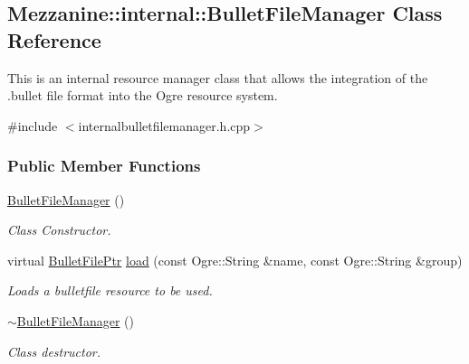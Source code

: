 \hypertarget{classMezzanine_1_1internal_1_1BulletFileManager}{
\subsection{Mezzanine::internal::BulletFileManager Class Reference}
\label{classMezzanine_1_1internal_1_1BulletFileManager}
}


This is an internal resource manager class that allows the integration of the .bullet file format into the Ogre resource system.  




{\ttfamily \#include $<$internalbulletfilemanager.h.cpp$>$}

\subsubsection*{Public Member Functions}
\begin{DoxyCompactItemize}
\item 
\hypertarget{classMezzanine_1_1internal_1_1BulletFileManager_a6025009b2daecdfff41cace8b3f51766}{
\hyperlink{classMezzanine_1_1internal_1_1BulletFileManager_a6025009b2daecdfff41cace8b3f51766}{BulletFileManager} ()}
\label{classMezzanine_1_1internal_1_1BulletFileManager_a6025009b2daecdfff41cace8b3f51766}

\begin{DoxyCompactList}\small\item\em Class Constructor. \item\end{DoxyCompactList}\item 
virtual \hyperlink{classMezzanine_1_1internal_1_1BulletFilePtr}{BulletFilePtr} \hyperlink{classMezzanine_1_1internal_1_1BulletFileManager_ae405dda559b6d5ec18ddf2838c8888ac}{load} (const Ogre::String \&name, const Ogre::String \&group)
\begin{DoxyCompactList}\small\item\em Loads a bulletfile resource to be used. \item\end{DoxyCompactList}\item 
\hypertarget{classMezzanine_1_1internal_1_1BulletFileManager_aa901ebc42ced1c9d6900cb77699e8da9}{
\hyperlink{classMezzanine_1_1internal_1_1BulletFileManager_aa901ebc42ced1c9d6900cb77699e8da9}{$\sim$BulletFileManager} ()}
\label{classMezzanine_1_1internal_1_1BulletFileManager_aa901ebc42ced1c9d6900cb77699e8da9}

\begin{DoxyCompactList}\small\item\em Class destructor. \item\end{DoxyCompactList}\end{DoxyCompactItemize}
